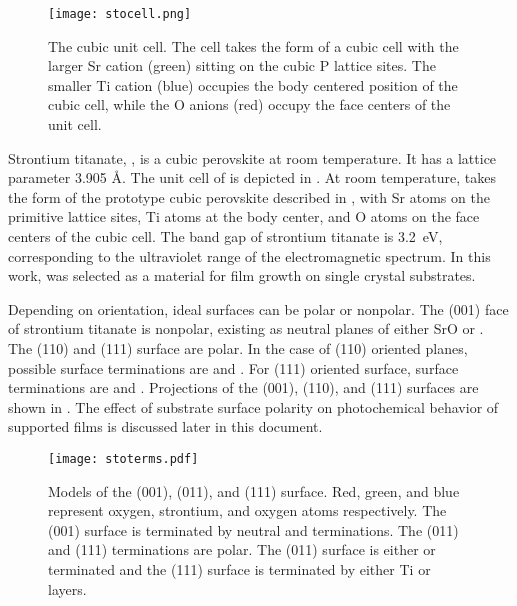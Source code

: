 \begin{figure}
\begin{center}
\texttt{[image: stocell.png]}
\caption[Cubic  unit cell]{%
	The cubic  unit cell. The cell takes the form of a 
	cubic cell with the larger Sr cation (green) sitting on the 
	cubic P lattice sites. The smaller Ti cation (blue) occupies 
	the body centered position of the cubic cell, while the O anions 
	(red) occupy the face centers of the unit cell.}
\label{fig:stocell}
\end{center}
\end{figure}

Strontium titanate, , is a cubic perovskite at room temperature. It has a lattice parameter 3.905 \si{\angstrom}. The unit cell of  is depicted in . At room temperature,  takes the form of the prototype cubic perovskite described in , with Sr atoms on the primitive lattice sites, Ti atoms at the body center, and O atoms on the face centers of the cubic cell. The band gap of strontium titanate is 3.2~eV,\cite{Cardona:1965vw} corresponding to the ultraviolet range of the electromagnetic spectrum. In this work,  was selected as a material for  film growth on single crystal substrates. 
 
Depending on orientation, ideal  surfaces can be polar or nonpolar. The (001) face of strontium titanate is nonpolar, existing as neutral planes of either SrO or . The (110) and (111) surface are polar. In the case of (110) oriented planes, possible surface terminations are  and . For (111) oriented surface, surface terminations are  and . Projections of the (001), (110), and (111) surfaces are shown in . The effect of substrate surface polarity on photochemical behavior of supported films is discussed later in this document.

\begin{figure}
	\texttt{[image: stoterms.pdf]}
		\caption[Low-index  surface terminations]{%
			Models of the  (001), (011), and (111) surface. 
			Red, green, and blue represent oxygen, strontium, and oxygen 
			atoms respectively. The (001) surface is terminated by neutral 
			 and  terminations. The (011) and (111) 
			terminations are polar. The (011) surface is either  
			or  terminated and the (111) surface is terminated by 
			either Ti or  layers.}
	\label{fig:stoterms}
\end{figure}

